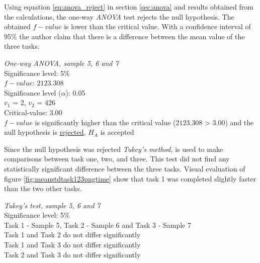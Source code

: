 Using equation \ref{eq:anova_reject} in section \ref{sec:anova} and results obtained from the calculations, the one-way \textit{ANOVA} test rejects the null hypothesis. The obtained $f-value$ is lower than the critical value. With a confidence interval of 95\% the author claim that there is a difference between the mean value of the three tasks.
\vspace{0.2cm}
 \begin{center}
	\begin{tcolorbox}[width=0.8\textwidth]
		\centering
		\textit{One-way \textit{ANOVA}, sample 5, 6 and 7}\\
		Significance level: 5\%  \\[0.5cm]
		
		$f-value$: $2123.308$ \\
		Significance level ($\alpha$): 0.05 \\
		$v_1$ = 2, $v_2$ = 426 \\
		Critical-value: 3.00 \\[0.2cm] %
		
		$f-value$ is significantly higher than the critical value ($2123.308$ > $3.00$) and the null hypothesis is \underline{rejected}, $H_A$ is accepted\\[0.5cm]
	\end{tcolorbox} 
\end{center}
\vspace{0.2cm}
Since the null hypothesis was rejected \textit{Tukey's method,} is used to make comparisons between task one, two, and three. This test did not find any statistically significant difference between the three tasks. Visual evaluation of figure \ref{fig:meanstdtask123pngtime} show that task 1 was completed slightly faster than the two other tasks. 
\vspace{0.2cm}
 \begin{center}
	\begin{tcolorbox}[width=0.8\textwidth]
		\centering
		\textit{Tukey's test, sample 5, 6 and 7}\\
		Significance level: 5\%  \\[0.5cm] 
		Task 1 - Sample 5, Task 2 - Sample 6 and Task 3 - Sample 7 \\[0.5cm]
		
		Task 1 and Task 2 do not differ significantly \\
		Task 1 and Task 3 do not differ significantly \\
		Task 2 and Task 3 do not differ significantly \\[0.2cm]
	\end{tcolorbox} 
\end{center}

